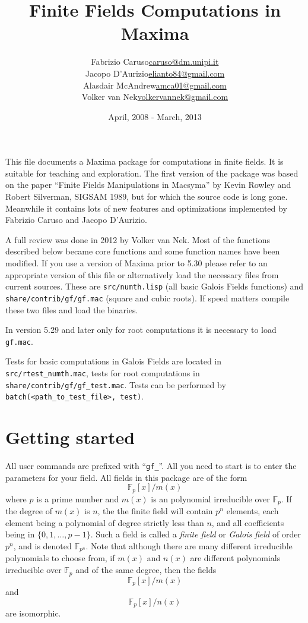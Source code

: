 \documentclass[a4paper,11pt,leqno,fleqn]{artikel3}
\title{Finite Fields Computations in Maxima}
\author{
\begin{tabular}{lr}  Fabrizio Caruso &  \url{caruso@dm.unipi.it} \\
 Jacopo D'Aurizio &  \url{elianto84@gmail.com} \\
 Alasdair McAndrew & \url{amca01@gmail.com}  \\
 Volker van Nek & \url{volkervannek@gmail.com} 
\end{tabular}
}
\date{April, 2008 - March, 2013}
\begin{document}
\maketitle


This file documents a Maxima package for computations in finite fields.  
It is suitable for teaching and exploration.
The first version of the package was based on the paper
``Finite Fields Manipulations in Macsyma'' by Kevin Rowley and Robert
Silverman, SIGSAM 1989, but for which the source code is long gone.
Meanwhile it contains lots of new features
and optimizations implemented by Fabrizio Caruso and Jacopo D'Aurizio.


A full review was done in 2012 by Volker van Nek. Most of the functions described below 
became core functions and some function names have been modified. 
If you use a version of Maxima prior to 5.30 please refer to an appropriate 
version of this file or alternatively load the necessary files from current sources. 
These are \texttt{src/numth.lisp} (all basic Galois Fields functions) 
and \texttt{share/contrib/gf/gf.mac} (square and cubic roots). 
If speed matters compile these two files and load the binaries.


In version 5.29 and later only for root computations it is necessary to 
load \texttt{gf.mac}. 


Tests for basic computations in Galois Fields are located in 
\texttt{src/rtest\_numth.mac}, tests for root computations in 
\texttt{share/contrib/gf/gf\_test.mac}. Tests can be performed by \\
\texttt{batch(<path\_to\_test\_file>, test)}.


\section*{Getting started}
All user commands are prefixed with ``\verb!gf_!''. All you need to start is
to enter the parameters for your field.  All fields in this package are of the
form
\[
\mathbb{F}_p[x]/{m(x)}
\]
where $p$ is a prime number and $m(x)$ is an polynomial irreducible over
$\mathbb{F}_p$.  If the degree of $m(x)$ is $n$, the the finite
field will contain $p^n$ elements, each element being a polynomial of degree
strictly less than $n$, and all coefficients being in $\{0,1,\ldots,p-1\}$.
Such a field is called a \emph{finite field} or \emph{Galois field} of order
$p^n$, and is denoted $\mathbb{F}_{p^n}$.  Note that although there are many different
irreducible polynomials to choose from, if $m(x)$ and $n(x)$ are different
polynomials irreducible over $\mathbb{F}_p$  and of the same degree,
then the fields 
\[
\mathbb{F}_p[x]/{m(x)}
\]
and
\[
\mathbb{F}_p[x]/{n(x)}
\]
are isomorphic.
\end{document}
